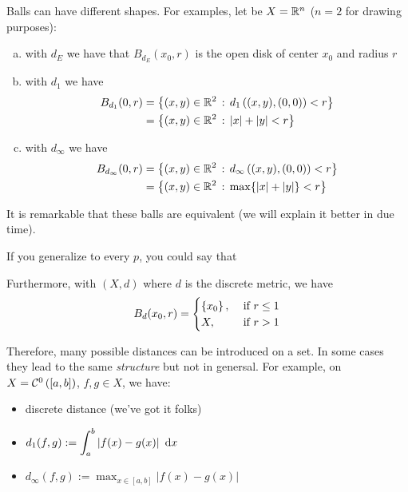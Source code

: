 Balls can have different shapes. For examples, let be $X=\mathbb{R}^n$ ($n=2$ for drawing purposes):
\begin{enumerate}[(a)]
    \item with $d_E$ we have that $B_{d_E}(x_0,r)$ is the open disk of center $x_0$ and radius $r$
    \item with $d_1$ we have
    \begin{align*}
        B_{d_1}(0,r)&=\left\{ (x,y)\in\mathbb{R}^2\,:\,d_1\left( (x,y),(0,0) \right)<r \right\} \\
        &=\left\{ (x,y)\in\mathbb{R}^2\,:\,|x|+|y|<r \right\}
    \end{align*}
    \item with $d_\infty$ we have
    \begin{align*}
        B_{d_\infty}(0,r)&=\left\{ (x,y)\in\mathbb{R}^2\,:\,d_\infty\left( (x,y),(0,0) \right)<r \right\} \\
        &=\left\{ (x,y)\in\mathbb{R}^2\,:\,\max\{|x|+|y|\}<r \right\}
    \end{align*}
    \begin{figure}[H]
    \centering
     \quad
     \quad
\end{figure}
\end{enumerate}

It is remarkable that these balls are equivalent (we will explain it better in due time). 

\newpage

If you generalize to every $p$, you could say that

Furthermore, with $(X,d)$ where $d$ is the discrete metric, we have
\begin{equation*}
B_d(x_0,r)=\begin{cases}
    \left\{ x_0 \right\}, &\text{ if }r\leq 1 \\
    X,&\text{ if }r>1    
\end{cases}
\end{equation*}

Therefore, many possible distances can be introduced on a set. In some cases they lead to the same \emph{structure} but not in genersal. For example, on $X=\mathcal{C}^0\left( [a,b] \right)$, $f,g\in X$, we have:
\begin{itemize}
    \item discrete distance (we've got it folks)
    \item $\displaystyle d_1(f,g):=\int_a^b\left| f(x)-g(x) \right|\  \mathrm{d} x$
    \item $\displaystyle d_\infty(f,g):=\max_{x\in[a,b]}\left| f(x)-g(x) \right|$
\end{itemize}

